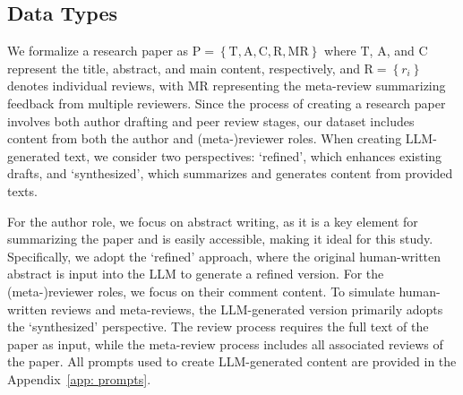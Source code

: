 \subsection{Data Types}


We formalize a research paper as $\mathrm{P}=\left\{ \mathrm{T},\mathrm{A},\mathrm{C},\mathrm{R},\mathrm{MR} \right\}$ where $\mathrm{T}$, $\mathrm{A}$, and $\mathrm{C}$ represent the title, abstract, and main content, respectively, and $\mathrm{R}=\left\{ r_i \right\}$ denotes individual reviews, with $\mathrm{MR}$ representing the meta-review summarizing feedback from multiple reviewers.
Since the process of creating a research paper involves both author drafting and peer review stages, our dataset includes content from both the author and (meta-)reviewer roles. 
When creating LLM-generated text, we consider two perspectives: `refined', which enhances existing drafts, and `synthesized', which summarizes and generates content from provided texts.


For the author role, we focus on abstract writing, as it is a key element for summarizing the paper and is easily accessible, making it ideal for this study. Specifically, we adopt the `refined' approach, where the original human-written abstract is input into the LLM to generate a refined version.
For the (meta-)reviewer roles, we focus on their comment content. To simulate human-written reviews and meta-reviews, the LLM-generated version primarily adopts the `synthesized' perspective. 
The review process requires the full text of the paper as input, while the meta-review process includes all associated reviews of the paper.
All prompts used to create LLM-generated content are provided in the Appendix~\ref{app: prompts}.





